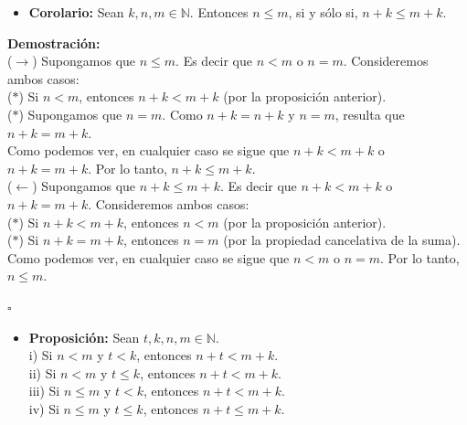 \documentclass[10 pt]{article}
\begin{document}
\begin{itemize}
    \item \Large{\textbf{Corolario:} Sean $k,n,m \in \mathbb N$. Entonces $n \leq m$, si y sólo si, $n+k \leq m+k$.} \\
\end{itemize}

\Large{\textbf{Demostración:} \\

($\rightarrow$) Supongamos que $n \leq m$. Es decir que $n<m$ o $n=m$. Consideremos ambos casos: \\

($\ast$) Si $n<m$, entonces $n+k<m+k$ (por la proposición anterior). \\

($\ast$) Supongamos que $n=m$. Como $n+k=n+k$ y $n=m$, resulta que $n+k=m+k$. \\

Como podemos ver, en cualquier caso se sigue que $n+k<m+k$ o $n+k=m+k$. Por lo tanto, $n+k \leq m+k$. \\

($\leftarrow$) Supongamos que $n+k \leq m+k$. Es decir que $n+k<m+k$ o $n+k=m+k$. Consideremos ambos casos: \\

($\ast$) Si $n+k<m+k$, entonces $n<m$ (por la proposición anterior). \\

($\ast$) Si $n+k=m+k$, entonces $n=m$ (por la propiedad cancelativa de la suma). \\

Como podemos ver, en cualquier caso se sigue que $n<m$ o $n=m$. Por lo tanto, $n \leq m$.} \\

\begin{flushright}
    $\square$
\end{flushright}

\begin{itemize}
    \item \Large{\textbf{Proposición:} Sean $t,k,n,m \in \mathbb N$. \\

    i) Si $n<m$ y $t<k$, entonces $n+t<m+k$. \\

    ii) Si $n<m$ y $t \leq k$, entonces $n+t<m+k$. \\

    iii) Si $n \leq m$ y $t<k$, entonces $n+t<m+k$. \\

    iv) Si $n \leq m$ y $t \leq k$, entonces $n+t \leq m+k$.}\\
\end{itemize}
\end{document}
